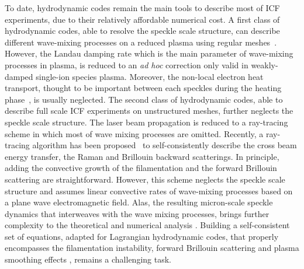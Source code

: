 \documentclass[
 reprint,
 superscriptaddress,
 amsmath,amssymb,
 aps,
]{revtex4-1}
\begin{document}
To date, hydrodynamic codes remain the main tools to describe most of ICF experiments, due to their relatively affordable numerical cost. A first class of hydrodynamic codes, able to resolve the speckle scale structure, can describe different wave-mixing processes on a reduced plasma using regular meshes~\cite{Berger_1995,Still_2006,Loiseau_2006, Huller_2006}. However, the Landau damping rate which is the main parameter of wave-mixing processes in plasma, is reduced to an \emph{ad hoc} correction only valid in weakly-damped single-ion species plasma. Moreover, the non-local electron heat transport, thought to be important between each speckles during the heating phase~\cite[]{POP_Batishchev_2002,POP_Feugeas_2008}, is usually neglected. The second class of hydrodynamic codes, able to describe full scale ICF experiments on unstructured meshes, further neglects the speckle scale structure. The laser beam propagation is reduced to a ray-tracing scheme in which most of wave mixing processes are omitted. Recently, a ray-tracing algorithm has been proposed~\cite{POP_Debayle_2019} to self-consistently describe the cross beam energy transfer, the Raman and Brillouin backward scatterings. In principle, adding the convective growth of the filamentation and the forward Brillouin scattering are straightforward. However, this scheme neglects the speckle scale structure and assumes linear convective rates of wave-mixing processes based on a plane wave electromagnetic field. Alas, the resulting micron-scale speckle dynamics that interweaves with the wave mixing processes, brings further complexity to the theoretical and numerical analysis \cite[]{POP_Duluc_2019}. Building a self-consistent set of equations, adapted for Lagrangian hydrodynamic codes, that properly encompasses the filamentation instability, forward Brillouin  scattering and plasma smoothing effects \cite[]{phd-Grech,POP_Grech_2006,PRL_Grech_2009}, remains a challenging task.
%
%
\end{document}
